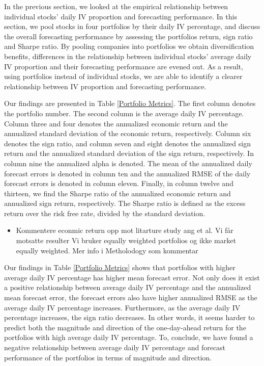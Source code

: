 In the previous section, we looked at the empirical relationship between individual stocks' daily IV proportion and forecasting performance. In this section, we pool stocks in four portfolios by their daily IV percentage, and discuss the overall forecasting performance by assessing the portfolios return, sign ratio and Sharpe ratio. By pooling companies into portfolios we obtain diversification benefits, differences in the relationship between individual stocks' average daily IV proportion and their forecasting performance are evened out. As a result, using portfolios instead of individual stocks, we are able to identify a clearer relationship between IV proportion and forecasting performance. 

Our findings are presented in Table \ref{Portfolio Metrics}. The first column denotes the portfolio number. The second column is the average daily IV percentage. Column three and four denotes the annualized economic return and the annualized standard deviation of the economic return, respectively. Column six denotes the sign ratio, and column seven and eight denotes the annualized sign return and the annualized standard deviation of the sign return, respectively. In column nine the annualized alpha is denoted. The mean of the annualized daily forecast errors is denoted in column ten and the annualized RMSE of the daily forecast errors is denoted in column eleven. Finally, in column twelve and thirteen, we find the Sharpe ratio of the annualized economic return and annualized sign return, respectively. The Sharpe ratio is defined as the excess return over the risk free rate, divided by the standard deviation.

\begin{itemize}
    \item Kommentere econmic return opp mot litarture study ang et al. Vi får motsatte resulter
    \itme Vi bruker equally weighted portfolios og ikke market equally weighted. Mer info i Metholodogy som kommentar
\end{itemize}

Our findings in Table \ref{Portfolio Metrics} shows that portfolios with higher average daily IV percentage has higher mean forecast error. Not only does it exist a positive relationship between average daily IV percentage and the annualized mean forecast error, the forecast errors also have higher annualized RMSE as the average daily IV percentage increases. Furthermore, as the average daily IV percentage increases, the sign ratio decreases. In other words, it seems harder to predict both the magnitude and direction of the one-day-ahead return for the portfolios with high average daily IV percentage. To, conclude, we have found a negative relationship between average daily IV percentage and forecast performance of the portfolios in terms of magnitude and direction. 

